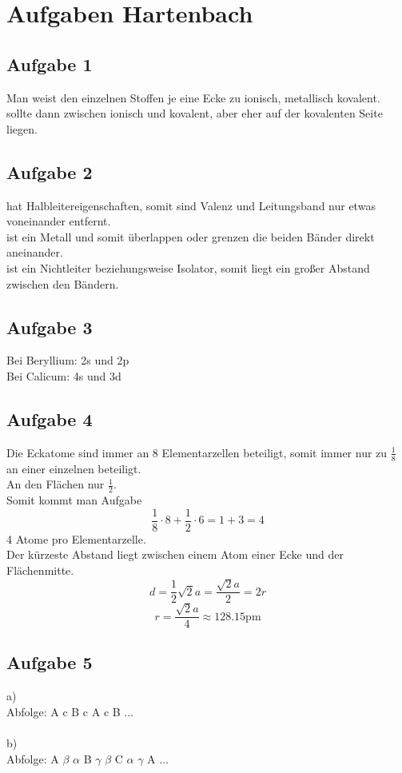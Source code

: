 \documentclass[a4paper]{article}
\begin{document}
\section*{Aufgaben Hartenbach}
\subsection*{Aufgabe 1}
Man weist den einzelnen Stoffen je eine Ecke zu  ionisch,  metallisch  kovalent.  sollte dann zwischen ionisch und kovalent, aber eher auf der kovalenten Seite liegen.
\subsection*{Aufgabe 2}
 hat Halbleitereigenschaften, somit sind Valenz und Leitungsband nur etwas voneinander entfernt.\\
 ist ein Metall und somit überlappen oder grenzen die beiden Bänder direkt aneinander.\\
 ist ein Nichtleiter beziehungsweise Isolator, somit liegt ein großer Abstand zwischen den Bändern.
\subsection*{Aufgabe 3}
Bei Beryllium: 2s und 2p\\
Bei Calicum: 4s und 3d\\
\subsection*{Aufgabe 4}
Die Eckatome sind immer an 8 Elementarzellen beteiligt, somit immer nur zu $\frac{1}{8}$ an einer einzelnen beteiligt.\\
An den Flächen nur $\frac{1}{2}$.\\
Somit kommt man Aufgabe
\begin{equation*}
    \frac{1}{8} \cdot 8 + \frac{1}{2} \cdot 6 = 1 + 3 = 4
\end{equation*}
4 Atome pro Elementarzelle.\\
Der kürzeste Abstand liegt zwischen einem Atom einer Ecke und der Flächenmitte.
\begin{equation*}
    d = \frac{1}{2}\sqrt{2}a = \frac{\sqrt{2}a}{2} = 2r
\end{equation*}
\begin{equation*}
    r = \frac{\sqrt{2}a}{4} \approx 128.15 \mathrm{pm}
\end{equation*}
\subsection*{Aufgabe 5}
a)\\
Abfolge: A c B c A c B $\dots$\\\\
b)\\
Abfolge: A $\beta$ $\alpha$ B $\gamma$ $\beta$ C $\alpha$ $\gamma$ A $\dots$
\end{document}
